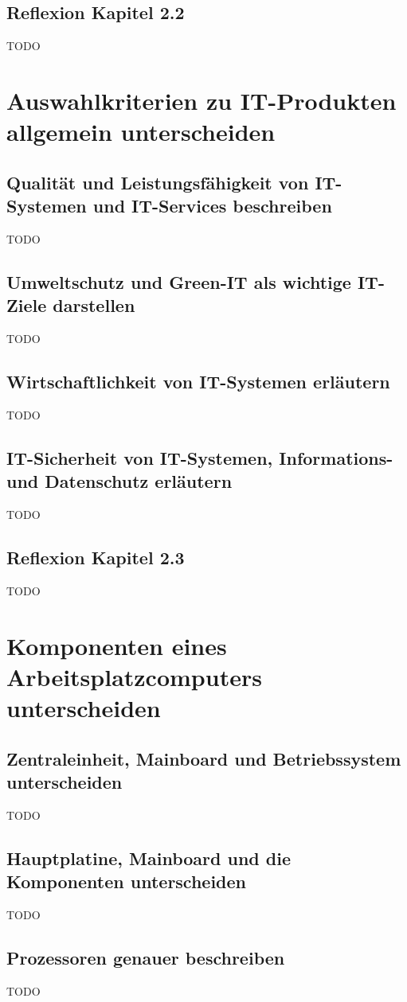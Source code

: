 \documentclass[11pt]{article}
\begin{document}
\subsection*{Reflexion Kapitel 2.2}
    TODO

\newpage
\section{Auswahlkriterien zu IT-Produkten allgemein unterscheiden}
\subsection{Qualität und Leistungsfähigkeit von IT-Systemen und IT-Services beschreiben}
    TODO
\subsection{Umweltschutz und Green-IT als wichtige IT-Ziele darstellen}
    TODO
\subsection{Wirtschaftlichkeit von IT-Systemen erläutern}
    TODO
\subsection{IT-Sicherheit von IT-Systemen, Informations- und Datenschutz erläutern}
    TODO
\subsection*{Reflexion Kapitel 2.3}
    TODO

\newpage
\section{Komponenten eines Arbeitsplatzcomputers unterscheiden}
\subsection{Zentraleinheit, Mainboard und Betriebssystem unterscheiden}
    TODO
\subsection{Hauptplatine, Mainboard und die Komponenten unterscheiden}
    TODO
\subsection{Prozessoren genauer beschreiben}
    TODO
\end{document}
